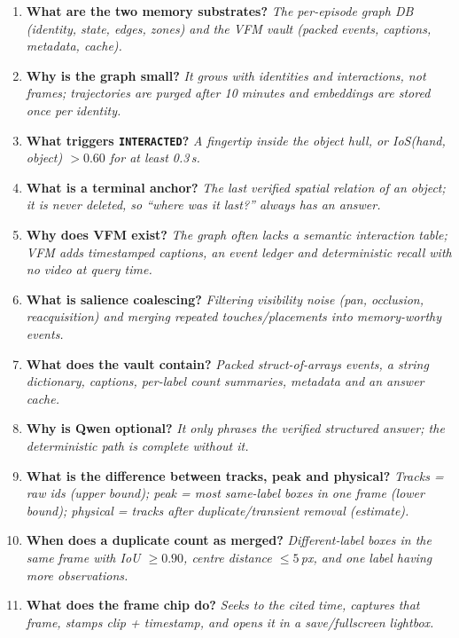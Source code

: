 \documentclass[10pt,a4paper]{article}
\newcommand{\code}[1]{\texttt{\small #1}}
\begin{document}
\begin{enumerate}[leftmargin=1.4em,itemsep=3pt]
  \item \textbf{What are the two memory substrates?} \emph{The per-episode graph DB (identity, state,
        edges, zones) and the VFM vault (packed events, captions, metadata, cache).}
  \item \textbf{Why is the graph small?} \emph{It grows with identities and interactions, not frames;
        trajectories are purged after 10 minutes and embeddings are stored once per identity.}
  \item \textbf{What triggers \code{INTERACTED}?} \emph{A fingertip inside the object hull, or
        IoS(hand, object) \(>0.60\) for at least 0.3\,s.}
  \item \textbf{What is a terminal anchor?} \emph{The last verified spatial relation of an object; it
        is never deleted, so ``where was it last?'' always has an answer.}
  \item \textbf{Why does VFM exist?} \emph{The graph often lacks a semantic interaction table; VFM
        adds timestamped captions, an event ledger and deterministic recall with no video at query
        time.}
  \item \textbf{What is salience coalescing?} \emph{Filtering visibility noise (pan, occlusion,
        reacquisition) and merging repeated touches/placements into memory-worthy events.}
  \item \textbf{What does the vault contain?} \emph{Packed struct-of-arrays events, a string
        dictionary, captions, per-label count summaries, metadata and an answer cache.}
  \item \textbf{Why is Qwen optional?} \emph{It only phrases the verified structured answer; the
        deterministic path is complete without it.}
  \item \textbf{What is the difference between tracks, peak and physical?} \emph{Tracks = raw ids
        (upper bound); peak = most same-label boxes in one frame (lower bound); physical = tracks
        after duplicate/transient removal (estimate).}
  \item \textbf{When does a duplicate count as merged?} \emph{Different-label boxes in the same frame
        with IoU \(\geq 0.90\), centre distance \(\leq 5\)\,px, and one label having more
        observations.}
  \item \textbf{What does the frame chip do?} \emph{Seeks to the cited time, captures that frame,
        stamps clip + timestamp, and opens it in a save/fullscreen lightbox.}

\end{enumerate}
\end{document}
